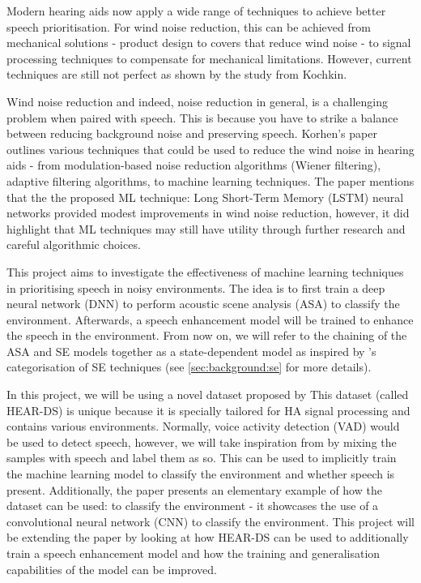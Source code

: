 \documentclass[logo,bsc,singlespacing,parskip,online]{infthesis}
\begin{document}
Modern hearing aids now apply a wide range of techniques to achieve 
better speech prioritisation. For wind noise reduction, this can be achieved 
from mechanical solutions - product design to covers that reduce wind noise - to 
signal processing techniques to compensate for mechanical limitations.
However, current techniques are still not perfect as shown by the study from Kochkin.

Wind noise reduction and indeed, noise reduction in general, is a challenging problem
when paired with speech. This is because you have 
to strike a balance between reducing background noise and
preserving speech. 
Korhen's paper \cite{Korhonen2021WindNoise} outlines 
various techniques that could be used to reduce the wind noise in hearing aids -
from modulation-based noise reduction algorithms (Wiener filtering),
adaptive filtering algorithms, to machine learning techniques.
The paper mentions that the the proposed ML technique:
Long Short-Term Memory (LSTM) neural networks provided
modest improvements in wind noise reduction, however, it did highlight
that ML techniques may still have utility through further research 
and careful algorithmic choices. 

This project aims to investigate the effectiveness of machine learning techniques 
in prioritising speech in noisy environments. The idea is to 
first train a deep neural network (DNN) to perform acoustic scene analysis (ASA) to classify the environment.
Afterwards, a speech enhancement model will be trained to enhance the speech in the environment.
From now on, we will refer to the chaining of the ASA and SE models together as a state-dependent model
as inspired by \citet{katagiri_handbook_2000}'s categorisation of SE techniques (see \ref{sec:background:se} for more details).

In this project, we will be using a novel dataset proposed by \citet{Huwel2020HearDS}
This dataset (called HEAR-DS) is unique because it is specially tailored for HA signal processing and contains
various environments. Normally, voice activity detection (VAD) would be 
used to detect speech, however, we will take inspiration from \citet{Huwel2020HearDS}
by mixing the samples with speech and label them as so. 
This can be used to implicitly train the machine learning model to classify the environment 
and whether speech is present. Additionally, the paper presents an 
elementary example of how the dataset can be used: to classify the environment -
it showcases the use of a convolutional neural network (CNN) to classify the environment.
This project will be extending the paper by looking at how HEAR-DS can be used 
to additionally train a speech enhancement model and how the training and 
generalisation capabilities of the model can be improved.
\end{document}
